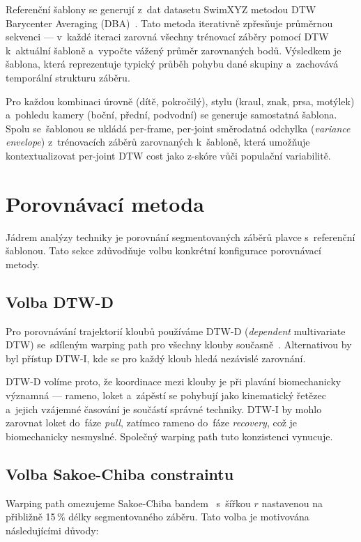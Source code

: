 Referenční šablony se generují z~dat datasetu SwimXYZ metodou DTW Barycenter Averaging (DBA)~\cite{petitjean2011dba}. Tato metoda iterativně zpřesňuje průměrnou sekvenci --- v~každé iteraci zarovná všechny trénovací záběry pomocí DTW k~aktuální šabloně a~vypočte vážený průměr zarovnaných bodů. Výsledkem je šablona, která reprezentuje typický průběh pohybu dané skupiny a~zachovává temporální strukturu záběru.

Pro každou kombinaci úrovně (dítě, pokročilý), stylu (kraul, znak, prsa, motýlek) a~pohledu kamery (boční, přední, podvodní) se generuje samostatná šablona. Spolu se~šablonou se ukládá per-frame, per-joint směrodatná odchylka (\textit{variance envelope}) z~trénovacích záběrů zarovnaných k~šabloně, která umožňuje kontextualizovat per-joint DTW cost jako z-skóre vůči populační variabilitě.

\section{Porovnávací metoda}
\label{sec:porovnavaci_metoda}

Jádrem analýzy techniky je porovnání segmentovaných záběrů plavce s~referenční šablonou. Tato sekce zdůvodňuje volbu konkrétní konfigurace porovnávací metody.

\subsection{Volba DTW-D}

Pro porovnávání trajektorií kloubů používáme DTW-D (\textit{dependent} multivariate DTW) se~sdíleným warping path pro všechny klouby současně~\cite{shokoohi2017}. Alternativou by byl přístup DTW-I, kde se pro každý kloub hledá nezávislé zarovnání.

DTW-D volíme proto, že koordinace mezi klouby je při plavání biomechanicky významná --- rameno, loket a~zápěstí se pohybují jako kinematický řetězec a~jejich vzájemné časování je součástí správné techniky. DTW-I by mohlo zarovnat loket do~fáze \textit{pull}, zatímco rameno do~fáze \textit{recovery}, což je biomechanicky nesmyslné. Společný warping path tuto konzistenci vynucuje.

\subsection{Volba Sakoe-Chiba constraintu}
\label{subsec:sakoe_chiba}

Warping path omezujeme Sakoe-Chiba bandem~\cite{sakoe1978} s~šířkou $r$ nastavenou na přibližně 15\,\% délky segmentovaného záběru. Tato volba je motivována následujícími důvody:

